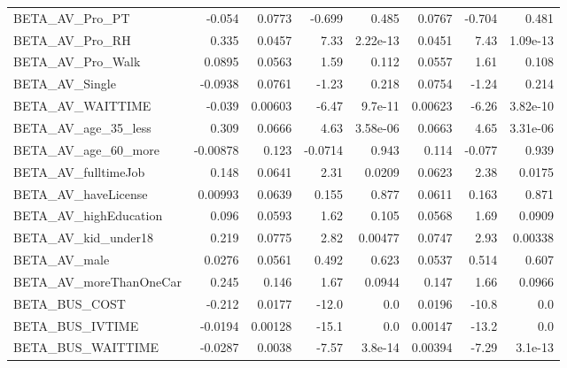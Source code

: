 \begin{tabular}{lrrrrrrr}
BETA\_AV\_Pro\_PT               &   -0.054 &   0.0773 &   -0.699 &    0.485 &        0.0767 &       -0.704 &         0.481 \\
BETA\_AV\_Pro\_RH               &    0.335 &   0.0457 &     7.33 & 2.22e-13 &        0.0451 &         7.43 &      1.09e-13 \\
BETA\_AV\_Pro\_Walk             &   0.0895 &   0.0563 &     1.59 &    0.112 &        0.0557 &         1.61 &         0.108 \\
BETA\_AV\_Single               &  -0.0938 &   0.0761 &    -1.23 &    0.218 &        0.0754 &        -1.24 &         0.214 \\
BETA\_AV\_WAITTIME             &   -0.039 &  0.00603 &    -6.47 &  9.7e-11 &       0.00623 &        -6.26 &      3.82e-10 \\
BETA\_AV\_age\_35\_less          &    0.309 &   0.0666 &     4.63 & 3.58e-06 &        0.0663 &         4.65 &      3.31e-06 \\
BETA\_AV\_age\_60\_more          & -0.00878 &    0.123 &  -0.0714 &    0.943 &         0.114 &       -0.077 &         0.939 \\
BETA\_AV\_fulltimeJob          &    0.148 &   0.0641 &     2.31 &   0.0209 &        0.0623 &         2.38 &        0.0175 \\
BETA\_AV\_haveLicense          &  0.00993 &   0.0639 &    0.155 &    0.877 &        0.0611 &        0.163 &         0.871 \\
BETA\_AV\_highEducation        &    0.096 &   0.0593 &     1.62 &    0.105 &        0.0568 &         1.69 &        0.0909 \\
BETA\_AV\_kid\_under18          &    0.219 &   0.0775 &     2.82 &  0.00477 &        0.0747 &         2.93 &       0.00338 \\
BETA\_AV\_male                 &   0.0276 &   0.0561 &    0.492 &    0.623 &        0.0537 &        0.514 &         0.607 \\
BETA\_AV\_moreThanOneCar       &    0.245 &    0.146 &     1.67 &   0.0944 &         0.147 &         1.66 &        0.0966 \\
BETA\_BUS\_COST                &   -0.212 &   0.0177 &    -12.0 &      0.0 &        0.0196 &        -10.8 &           0.0 \\
BETA\_BUS\_IVTIME              &  -0.0194 &  0.00128 &    -15.1 &      0.0 &       0.00147 &        -13.2 &           0.0 \\
BETA\_BUS\_WAITTIME            &  -0.0287 &   0.0038 &    -7.57 &  3.8e-14 &       0.00394 &        -7.29 &       3.1e-13 \\

\end{tabular}
